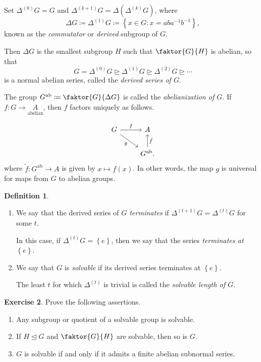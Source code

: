 \documentclass[10pt,letterpaper,cm]{nupset}
\theoremstyle{definition}
\newtheorem{definition}{Definition}[subsection]
\theoremstyle{theorem}
\newtheorem{exercise}[definition]{Exercise}
\theoremstyle{remark}
\newcommand{\1}{\mathbf{1}}
\newcommand{\0}{\vec 0}
\DeclareMathOperator{\ab}{ab}
\begin{document}
\smallskip

Set $\Delta^{(0)}G =G$ and $\Delta^{(k+1)}G = \Delta(\Delta^{(k)}G)$, where $$\Delta G\coloneqq \Delta^{(1)} G \coloneqq \left\{x\in G : x =aba^{-1}b^{-1}\right\},$$ known as the \textit{commutator} or \textit{derived} subgroup of $G$.

\smallskip

Then $\Delta G$ is the smallest subgroup $H$ such that $\faktor{G}{H}$ is abelian, so that $$G = \Delta^{(0)}G \unrhd \Delta^{(1)}G \unrhd \Delta^{(2)}G \unrhd \cdots $$ is a normal abelian series, called the \textit{derived series of $G$}.

\smallskip

The group $G^{\ab}\coloneqq  \faktor{G}{\Delta G}$ is called the \textit{abelianization of $G$}.
If $f: G \longrightarrow \underset{\text{abelian}} A$, then $f$ factors uniquely as follows.

\[ \begin{tikzcd}
G \arrow[r, "f"] \arrow[dr, "g", swap] & A \\
 & G^{\ab}\arrow[u, "\tilde{f}", swap].
\end{tikzcd}
\]
where $\tilde{f}: G^{\ab} \to A$ is given by $x\mapsto f(x)$.
In other words, the map $g$ is universal for maps from $G$ to abelian groups. 


\begin{definition} $ $
\begin{enumerate}
\item We say that the derived series of $G$ \textit{terminates} if $\Delta^{(t+1)}G = \Delta^{(t)}G$ for some $t$. 

In this case, if $\Delta^{(t)}G=\left\{e\right\}$, then we say that the series \textit{terminates at $\left\{e\right\}$}.
\item We say that $G$ is \textit{solvable} if its derived series terminates at $\left\{e\right\}$. 

The least $t$ for which $\Delta^{(t)}$ is trivial is called the \textit{solvable length of $G$}.
\end{enumerate}
\end{definition}


\begin{exercise}\label{ex7} Prove the following assertions.
\begin{enumerate}
\item Any subgroup or quotient of a solvable group is solvable.
\item If $H\unlhd G$ and $\faktor{G}{H}$ are solvable, then so is $G$.
\item $G$ is solvable  if and only if it admits a finite abelian subnormal series. 
\end{enumerate}
\end{exercise}
\end{document}
